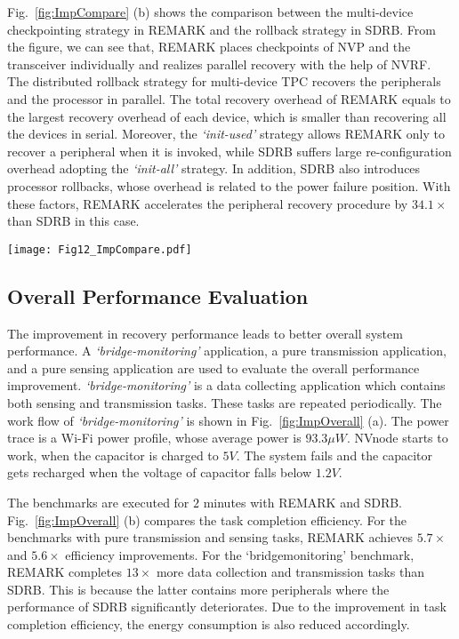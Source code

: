 Fig.~\ref{fig:ImpCompare} (b) shows the comparison between the multi-device checkpointing strategy in REMARK and the rollback strategy in SDRB.
From the figure, we can see that, REMARK places checkpoints of NVP and the transceiver individually and realizes parallel recovery with the help of NVRF.
The distributed rollback strategy for multi-device TPC recovers the peripherals and the processor in parallel.
The total recovery overhead of REMARK equals to the largest recovery overhead of each device, which is smaller than recovering all the devices in serial.
Moreover, the \emph{`init-used'} strategy allows REMARK only to recover a peripheral when it is invoked, while SDRB suffers large re-configuration overhead adopting the \emph{`init-all'} strategy.
In addition, SDRB also introduces processor rollbacks, whose overhead is related to the power failure position.
With these factors, REMARK accelerates the peripheral recovery procedure by $34.1\times$ than SDRB in this case.

%
\begin{figure*}[htpb]
    \centering
    \texttt{[image: Fig12\_ImpCompare.pdf]}
    \vspace{-25pt}
    \caption{Recover overhead and task completeness comparison between REMARK and SDRB.}
    \label{fig:ImpCompare}
\end{figure*}

\subsection{Overall Performance Evaluation} \label{sec:implOverall}
\vspace{-5pt}
%
The improvement in recovery performance leads to better overall system performance. 
A \emph{`bridge-monitoring'} application, a pure transmission application, and a pure sensing application are used to evaluate the overall performance improvement.
\emph{`bridge-monitoring'} is a data collecting application which contains both sensing and transmission tasks. 
These tasks are repeated periodically.
The work flow of \emph{`bridge-monitoring'} is shown in Fig.~\ref{fig:ImpOverall} (a).
The power trace is a Wi-Fi power profile, whose average power is $93.3\mu W$.
NVnode starts to work, when the capacitor is charged to $5V$.
The system fails and the capacitor gets recharged when the voltage of capacitor falls below $1.2V$.

The benchmarks are executed for $2$ minutes with REMARK and SDRB.
Fig.~\ref{fig:ImpOverall} (b) compares the task completion efficiency.
For the benchmarks with pure transmission and sensing tasks, REMARK achieves $5.7\times$ and $5.6\times$ efficiency improvements.
For the ‘bridgemonitoring’ benchmark, REMARK completes $13\times$ more data collection and transmission tasks than SDRB.
This is because the latter contains more peripherals where the performance of SDRB significantly deteriorates.
Due to the improvement in task completion efficiency, the energy consumption is also reduced accordingly. 

